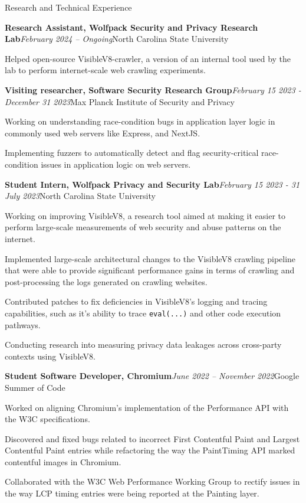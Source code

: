 \documentclass{resume} %
\begin{document}
\begin{rSection}{Research and Technical Experience}
\begin{rSubsection}{\bf Research Assistant, Wolfpack Security and Privacy Research Lab}{\em February 2024 -- Ongoing}{North Carolina State University}{}
\item Helped open-source VisibleV8-crawler, a version of an internal tool used by the lab to perform internet-scale web crawling experiments.
\end{rSubsection}
\begin{rSubsection}{\bf Visiting researcher, Software Security Research Group}{\em February 15 2023 - December 31 2023}{Max Planck Institute of Security and Privacy}{}
\item Working on understanding race-condition bugs in application layer logic in commonly used web servers like Express, and NextJS.
\item Implementing fuzzers to automatically detect and flag security-critical race-condition issues in application logic on web servers.
\end{rSubsection}
\begin{rSubsection}{\bf Student Intern, Wolfpack Privacy and Security Lab}{\em February 15 2023 - 31 July 2023}{North Carolina State University}{}
\item Working on improving VisibleV8, a research tool aimed at making it easier to perform large-scale measurements of web security and abuse patterns on the internet.
\item Implemented large-scale architectural changes to the VisibleV8 crawling pipeline that were able to provide significant performance gains in terms of crawling and post-processing the logs generated on crawling websites.
\item Contributed patches to fix deficiencies in VisibleV8's logging and tracing capabilities, such as it's ability to trace \texttt{eval(...)} and other code execution pathways.
\item Conducting research into measuring privacy data leakages across cross-party contexts using VisibleV8.
\end{rSubsection}
\begin{rSubsection}{\bf Student Software Developer, Chromium}{\em June 2022 -- November 2022}{Google Summer of Code}{}
\item Worked on aligning Chromium's implementation of the Performance API with the W3C specifications.
\item Discovered and fixed bugs related to incorrect First Contentful Paint and Largest Contentful Paint entries while refactoring the way the PaintTiming API marked contentful images in Chromium.
\item Collaborated with the W3C Web Performance Working Group to rectify issues in the way LCP timing entries were being reported at the Painting layer.

\end{rSubsection}
\end{rSection}
\end{document}
